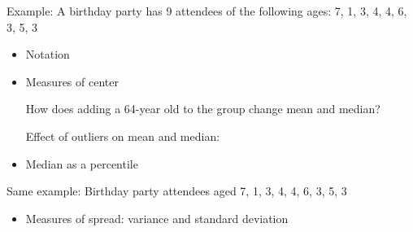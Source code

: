\documentclass[11pt,letterpaper,twoside]{article}
\begin{document}
\newpage

Example: A birthday party has 9 attendees of the following ages: 7, 1, 3, 4, 4, 6, 3, 5, 3

\begin{itemize}

\item Notation \vspace{60pt}

\item Measures of center \vspace{240pt}

How does adding a 64-year old to the group change mean and median? \vspace{60pt}

Effect of outliers on mean and median: \vspace{80pt}

\item Median as a percentile

\end{itemize}

\newpage

Same example: Birthday party attendees aged 7, 1, 3, 4, 4, 6, 3, 5, 3

\begin{itemize}

\item Measures of spread: variance and standard deviation \vspace{240pt}

\end{itemize}
\end{document}
